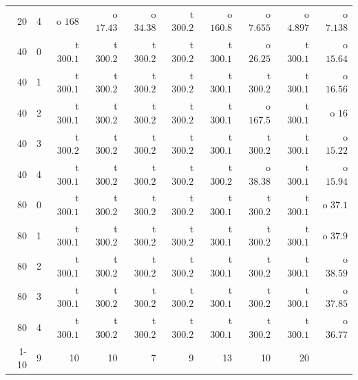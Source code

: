 \begin{table}[ht]
\begin{tabular}{@{}rrrrrrrrrr@{}}
20 & 4 & o $168$ & o $17.43$ & o $34.38$ & t $300.2$ & o $160.8$ & o $7.655$ & o $4.897$ & o $7.138$\\
40 & 0 & t $300.1$ & t $300.2$ & t $300.2$ & t $300.2$ & t $300.1$ & o $26.25$ & t $300.1$ & o $15.64$\\
40 & 1 & t $300.1$ & t $300.2$ & t $300.2$ & t $300.2$ & t $300.1$ & t $300.2$ & t $300.1$ & o $16.56$\\
40 & 2 & t $300.1$ & t $300.2$ & t $300.2$ & t $300.2$ & t $300.1$ & o $167.5$ & t $300.1$ & o $16$\\
40 & 3 & t $300.2$ & t $300.2$ & t $300.2$ & t $300.2$ & t $300.1$ & t $300.2$ & t $300.1$ & o $15.22$\\
40 & 4 & t $300.1$ & t $300.2$ & t $300.2$ & t $300.2$ & t $300.2$ & o $38.38$ & t $300.1$ & o $15.94$\\
80 & 0 & t $300.1$ & t $300.2$ & t $300.2$ & t $300.2$ & t $300.1$ & t $300.2$ & t $300.1$ & o $37.1$\\
80 & 1 & t $300.1$ & t $300.2$ & t $300.2$ & t $300.2$ & t $300.1$ & t $300.2$ & t $300.1$ & o $37.9$\\
80 & 2 & t $300.1$ & t $300.2$ & t $300.2$ & t $300.2$ & t $300.1$ & t $300.2$ & t $300.1$ & o $38.59$\\
80 & 3 & t $300.1$ & t $300.2$ & t $300.2$ & t $300.2$ & t $300.1$ & t $300.2$ & t $300.1$ & o $37.85$\\
80 & 4 & t $300.1$ & t $300.2$ & t $300.2$ & t $300.2$ & t $300.1$ & t $300.2$ & t $300.1$ & o $36.77$\\
\cmidrule{1-10}
\multicolumn{2}{@{}l}{Solved} & 9 & 10 & 10 & 7 & 9 & 13 & 10 & 20\\
\bottomrule
\end{tabular}
\end{table}


